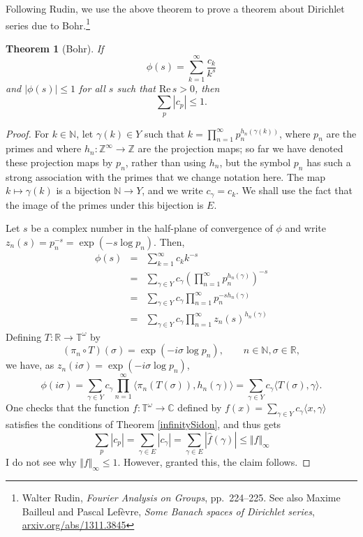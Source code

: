 \documentclass{article}
\newcommand{\inner}[2]{\langle #1, #2 \rangle}
\def\Re{\ensuremath{\mathrm{Re}}\,}
\newcommand{\norm}[1]{\Vert #1 \Vert}
\newtheorem{theorem}{Theorem}
\begin{document}
Following Rudin, we use the above theorem to prove a theorem about Dirichlet series
due to Bohr.\footnote{Walter Rudin, {\em Fourier Analysis on Groups}, pp.~224--225. See also 
Maxime Bailleul and Pascal Lef\`evre,
{\em Some Banach spaces of Dirichlet series},
\url{arxiv.org/abs/1311.3845}} 

\begin{theorem}[Bohr]
If
\[
\phi(s) = \sum_{k=1}^\infty \frac{c_k}{k^s}
\]
and $|\phi(s)| \leq 1$ for all $s$ such that $\Re s>0$, then
\[
\sum_p |c_p| \leq 1.
\]
\end{theorem}
\begin{proof}
For $k \in \mathbb{N}$, let $\gamma(k) \in Y$ such that $k=\prod_{n=1}^\infty p_n^{h_n (\gamma(k))}$, where $p_n$ are the primes and
where $h_n:\mathbb{Z}^\infty \to \mathbb{Z}$ are the projection maps; so far we have denoted these projection maps by $p_n$, rather than using $h_n$,
but the symbol $p_n$ has such a strong association with the primes that we change notation here. The map $k \mapsto \gamma(k)$ is a bijection
$\mathbb{N} \to Y$, and we write $c_\gamma=c_k$. We shall use the fact that the image of the primes under this bijection is $E$.

Let $s$ be a complex number in the half-plane of  convergence of $\phi$ and write $z_n(s)=p_n^{-s}=\exp(-s \log p_n)$. Then,
\begin{eqnarray*}
\phi(s) &=&\sum_{k =1}^\infty c_k k^{-s} \\
&=&\sum_{\gamma \in Y} c_\gamma \left(\prod_{n=1}^\infty p_n^{h_n (\gamma)} \right)^{-s}\\
&=&\sum_{\gamma \in Y} c_\gamma \prod_{n=1}^\infty p_n^{-s h_n(\gamma)}\\
&=&\sum_{\gamma \in Y} c_\gamma \prod_{n=1}^\infty z_n(s)^{h_n(\gamma)}
\end{eqnarray*}
Defining
 $T:\mathbb{R} \to \mathbb{T}^\omega$ by
\[
(\pi_n \circ T)(\sigma)=\exp(-i \sigma \log p_n), \qquad n \in \mathbb{N}, \sigma \in \mathbb{R}, 
\]
we have, as $z_n(i\sigma)=\exp(-i\sigma \log p_n)$,
\[
\phi(i\sigma) 
=\sum_{\gamma \in Y} c_\gamma \prod_{n=1}^\infty \inner{\pi_n(T(\sigma))}{h_n(\gamma)}
=\sum_{\gamma \in Y} c_\gamma \inner{T(\sigma)}{\gamma}.
\]
One checks that the function $f:\mathbb{T}^\omega \to \mathbb{C}$ defined by $f(x) = \sum_{\gamma \in Y} c_\gamma \inner{x}{\gamma}$
satisfies the conditions of
 Theorem \ref{infinitySidon}, and thus gets
 \[
\sum_p |c_p| = \sum_{\gamma \in E} |c_\gamma| =  \sum_{\gamma \in E} |\hat{f}(\gamma)| \leq \norm{f}_\infty 
 \]
 I do not see why $\norm{f}_\infty \leq 1$. However, granted this, the claim follows.
\end{proof}
\end{document}
